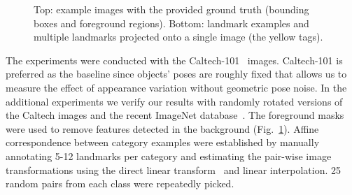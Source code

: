 \documentclass[10pt,journal,cspaper,compsoc]{IEEEtran}
\begin{document}
\begin{figure}[h]
\begin{center}
  \caption{Top: example images with the provided ground truth (bounding boxes and foreground regions).
    Bottom: landmark examples and multiple landmarks projected onto
    a single image (the yellow tags).
    \label{fig:caltech}}
  \end{center}
\end{figure}
%
The experiments were conducted with the Caltech-101~\cite{FeiFerPer:2006} images.
Caltech-101 is preferred as the baseline
since objects' poses are roughly fixed that allows us to measure
the effect of appearance variation without geometric pose noise.
In the additional experiments we verify our results with randomly rotated
versions of the Caltech images and the recent
ImageNet database~\cite{imagenet}.
The foreground masks were used to remove features detected
in the background (Fig.~\ref{fig:caltech}). Affine correspondence between category examples were established
by manually annotating 5-12 landmarks per category and estimating the pair-wise image
transformations using the direct linear transform~\cite{HarZis:2003} and linear interpolation.
25 random pairs from each class were repeatedly picked.
\end{document}
